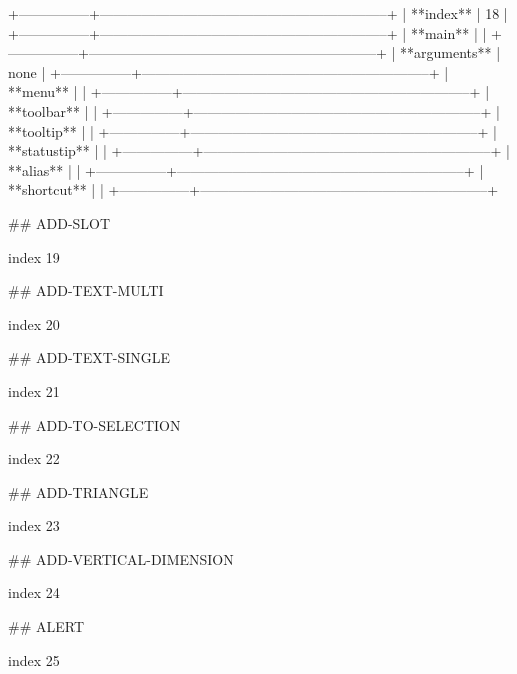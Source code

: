 +---------------+--------------------------------------------------------------+
| **index**     | 18                                                           |
+---------------+--------------------------------------------------------------+
| **main**      |                                                              |
+---------------+--------------------------------------------------------------+
| **arguments** | none                                                         |
+---------------+--------------------------------------------------------------+
| **menu**      |                                                              |
+---------------+--------------------------------------------------------------+
| **toolbar**   |                                                              |
+---------------+--------------------------------------------------------------+
| **tooltip**   |                                                              |
+---------------+--------------------------------------------------------------+
| **statustip** |                                                              |
+---------------+--------------------------------------------------------------+
| **alias**     |                                                              |
+---------------+--------------------------------------------------------------+
| **shortcut**  |                                                              |
+---------------+--------------------------------------------------------------+


## ADD-SLOT

index 19



## ADD-TEXT-MULTI

index 20



## ADD-TEXT-SINGLE

index 21



## ADD-TO-SELECTION

index 22



## ADD-TRIANGLE

index 23



## ADD-VERTICAL-DIMENSION

index 24



## ALERT

index 25



